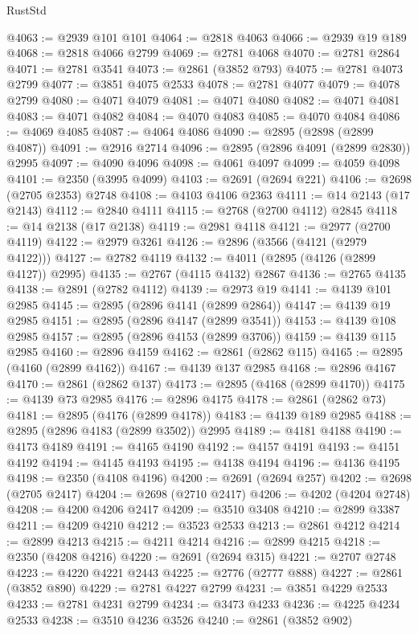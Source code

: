 \begin{lexlean}{RustStd}
\begin{coremodule}
@4063 := @2939 @101 @101
@4064 := @2818 @4063
@4066 := @2939 @19 @189
@4068 := @2818 @4066 @2799
@4069 := @2781 @4068
@4070 := @2781 @2864
@4071 := @2781 @3541
@4073 := @2861 (@3852 @793)
@4075 := @2781 @4073 @2799
@4077 := @3851 @4075 @2533
@4078 := @2781 @4077
@4079 := @4078 @2799
@4080 := @4071 @4079
@4081 := @4071 @4080
@4082 := @4071 @4081
@4083 := @4071 @4082
@4084 := @4070 @4083
@4085 := @4070 @4084
@4086 := @4069 @4085
@4087 := @4064 @4086
@4090 := @2895 (@2898 (@2899 @4087))
@4091 := @2916 @2714
@4096 := @2895 (@2896 @4091 (@2899 @2830)) @2995
@4097 := @4090 @4096
@4098 := @4061 @4097
@4099 := @4059 @4098
@4101 := @2350 (@3995 @4099)
@4103 := @2691 (@2694 @221)
@4106 := @2698 (@2705 @2353) @2748
@4108 := @4103 @4106 @2363
@4111 := @14 @2143 (@17 @2143)
@4112 := @2840 @4111
@4115 := @2768 (@2700 @4112) @2845
@4118 := @14 @2138 (@17 @2138)
@4119 := @2981 @4118
@4121 := @2977 (@2700 @4119)
@4122 := @2979 @3261
@4126 := @2896 (@3566 (@4121 (@2979 @4122)))
@4127 := @2782 @4119
@4132 := @4011 (@2895 (@4126 (@2899 @4127)) @2995)
@4135 := @2767 (@4115 @4132) @2867
@4136 := @2765 @4135
@4138 := @2891 (@2782 @4112)
@4139 := @2973 @19
@4141 := @4139 @101 @2985
@4145 := @2895 (@2896 @4141 (@2899 @2864))
@4147 := @4139 @19 @2985
@4151 := @2895 (@2896 @4147 (@2899 @3541))
@4153 := @4139 @108 @2985
@4157 := @2895 (@2896 @4153 (@2899 @3706))
@4159 := @4139 @115 @2985
@4160 := @2896 @4159
@4162 := @2861 (@2862 @115)
@4165 := @2895 (@4160 (@2899 @4162))
@4167 := @4139 @137 @2985
@4168 := @2896 @4167
@4170 := @2861 (@2862 @137)
@4173 := @2895 (@4168 (@2899 @4170))
@4175 := @4139 @73 @2985
@4176 := @2896 @4175
@4178 := @2861 (@2862 @73)
@4181 := @2895 (@4176 (@2899 @4178))
@4183 := @4139 @189 @2985
@4188 := @2895 (@2896 @4183 (@2899 @3502)) @2995
@4189 := @4181 @4188
@4190 := @4173 @4189
@4191 := @4165 @4190
@4192 := @4157 @4191
@4193 := @4151 @4192
@4194 := @4145 @4193
@4195 := @4138 @4194
@4196 := @4136 @4195
@4198 := @2350 (@4108 @4196)
@4200 := @2691 (@2694 @257)
@4202 := @2698 (@2705 @2417)
@4204 := @2698 (@2710 @2417)
@4206 := @4202 (@4204 @2748)
@4208 := @4200 @4206 @2417
@4209 := @3510 @3408
@4210 := @2899 @3387
@4211 := @4209 @4210
@4212 := @3523 @2533
@4213 := @2861 @4212
@4214 := @2899 @4213
@4215 := @4211 @4214
@4216 := @2899 @4215
@4218 := @2350 (@4208 @4216)
@4220 := @2691 (@2694 @315)
@4221 := @2707 @2748
@4223 := @4220 @4221 @2443
@4225 := @2776 (@2777 @888)
@4227 := @2861 (@3852 @890)
@4229 := @2781 @4227 @2799
@4231 := @3851 @4229 @2533
@4233 := @2781 @4231 @2799
@4234 := @3473 @4233
@4236 := @4225 @4234 @2533
@4238 := @3510 @4236 @3526
@4240 := @2861 (@3852 @902)

\end{coremodule}
\end{lexlean}

